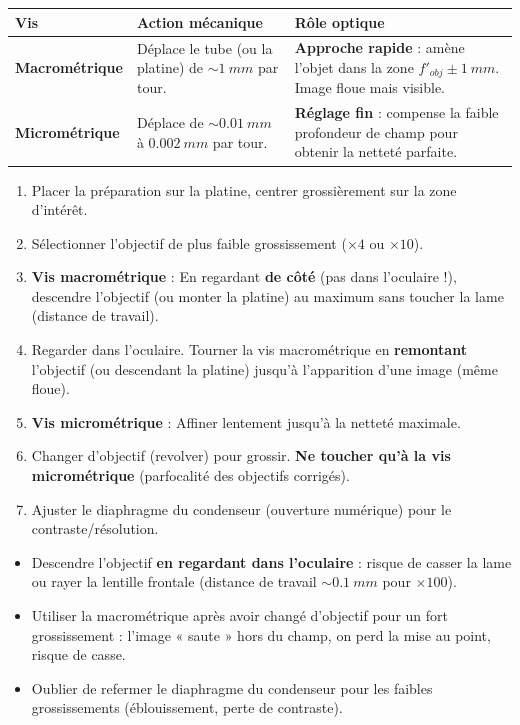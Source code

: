 \documentclass[11pt]{article}
\newcounter{popsec}
\newcounter{popsub}
\newcommand{\courssub}[1]{%
  \stepcounter{popsub}%
  \par\vspace{9pt}\noindent{\popxbold\fontsize{11.5}{13}\selectfont\color{popink}{\color{poporange}\thepopsec.\thepopsub}\hspace{6pt}#1}\par\nopagebreak\vspace{4pt}
}
\begin{document}
\courssub{Les deux vis de mise au point}

\begin{center}
\begin{tabularx}{\linewidth}{|l|X|X|}\hline
\rowcolor{popblueL}
\textbf{Vis} & \textbf{Action mécanique} & \textbf{Rôle optique} \\ \hline
\textbf{Macrométrique} & Déplace le tube (ou la platine) de $\sim \SI{1}{mm}$ par tour. & \textbf{Approche rapide} : amène l'objet dans la zone $f'_{obj} \pm \SI{1}{mm}$. Image floue mais visible. \\ \hline
\textbf{Micrométrique} & Déplace de $\sim \SI{0,01}{mm}$ à $\SI{0,002}{mm}$ par tour. & \textbf{Réglage fin} : compense la faible profondeur de champ pour obtenir la netteté parfaite. \\ \hline
\end{tabularx}
\end{center}

\begin{methode}
\begin{enumerate}
    \item Placer la préparation sur la platine, centrer grossièrement sur la zone d'intérêt.
    \item Sélectionner l'objectif de plus faible grossissement ($\times 4$ ou $\times 10$).
    \item \textbf{Vis macrométrique} : En regardant \textbf{de côté} (pas dans l'oculaire !), descendre l'objectif (ou monter la platine) au maximum sans toucher la lame (distance de travail).
    \item Regarder dans l'oculaire. Tourner la vis macrométrique en \textbf{remontant} l'objectif (ou descendant la platine) jusqu'à l'apparition d'une image (même floue).
    \item \textbf{Vis micrométrique} : Affiner lentement jusqu'à la netteté maximale.
    \item Changer d'objectif (revolver) pour grossir. \textbf{Ne toucher qu'à la vis micrométrique} (parfocalité des objectifs corrigés).
    \item Ajuster le diaphragme du condenseur (ouverture numérique) pour le contraste/résolution.
\end{enumerate}
\end{methode}

\begin{attention}
\begin{itemize}
    \item Descendre l'objectif \textbf{en regardant dans l'oculaire} : risque de casser la lame ou rayer la lentille frontale (distance de travail $\sim \SI{0,1}{mm}$ pour $\times 100$).
    \item Utiliser la macrométrique après avoir changé d'objectif pour un fort grossissement : l'image « saute » hors du champ, on perd la mise au point, risque de casse.
    \item Oublier de refermer le diaphragme du condenseur pour les faibles grossissements (éblouissement, perte de contraste).
\end{itemize}
\end{attention}
\end{document}
